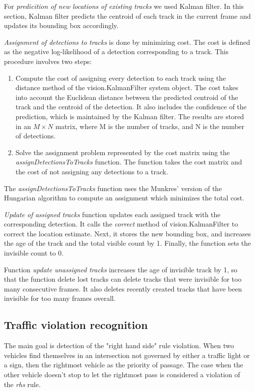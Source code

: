 \documentclass[12pt]{article} %
\begin{document}
For \textit{predicition of new locations of existing tracks} we used Kalman filter. In this section, Kalman filter predicts the centroid of each track in the current frame and updates its bounding box accordingly. 

\textit{Assignment of detections to tracks} is done by minimizing cost. The cost is defined as the negative log-likelihood of a detection corresponding to a track. This procedure involves two steps:
\begin{enumerate}
\item Compute the cost of assigning every detection to each track using the distance method of the vision.KalmanFilter system object. The cost takes into account the Euclidean distance between the predicted centroid of the track and the centroid of the detection. It also includes the confidence of the prediction, which is maintained by the Kalman filter. The results are stored in an $M\times N$ matrix, where M is the number of tracks, and N is the number of detections.

\item Solve the assignment problem represented by the cost matrix using the \textit{assignDetectionsToTracks} function. The function takes the cost matrix and the cost of not assigning any detections to a track.
\end{enumerate}


The \textit{assignDetectionsToTracks} function uses the Munkres' version of the Hungarian algorithm to compute an assignment which minimizes the total cost.

\textit{Update of assigned tracks} function updates each assigned track with the corresponding detection. It calls the \textit{correct} method of vision.KalmanFilter to correct the location estimate. Next, it stores the new bounding box, and increases the age of the track and the total visible count by 1. Finally, the function sets the invisible count to 0.

Function \textit{update unassigned tracks} increases the age of invisible track by 1, so that the function {delete lost tracks} can delete tracks that were invisible for too many consecutive frames. It also deletes recently created tracks that have been invisible for too many frames overall.


\subsection{Traffic violation recognition}
The main goal is detection of the "right hand side" rule violation. When two vehicles find themselves in an intersection not governed by either a traffic light or a sign, then the rightmost vehicle as the priority of passage. The case when the other vehicle doesn't stop to let the rightmost pass is considered a violation of the \textit{rhs} rule. 
\end{document}
